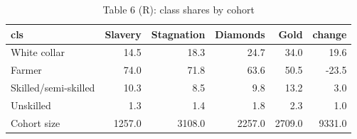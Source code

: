\begin{table}

\caption{Table 6 (R): class shares by cohort}
\centering
\begin{tabular}[t]{lrrrrr}
\toprule
cls & Slavery & Stagnation & Diamonds & Gold & change\\
\midrule
White collar & 14.5 & 18.3 & 24.7 & 34.0 & 19.6\\
Farmer & 74.0 & 71.8 & 63.6 & 50.5 & -23.5\\
Skilled/semi-skilled & 10.3 & 8.5 & 9.8 & 13.2 & 3.0\\
Unskilled & 1.3 & 1.4 & 1.8 & 2.3 & 1.0\\
Cohort size & 1257.0 & 3108.0 & 2257.0 & 2709.0 & 9331.0\\
\bottomrule
\end{tabular}
\end{table}
